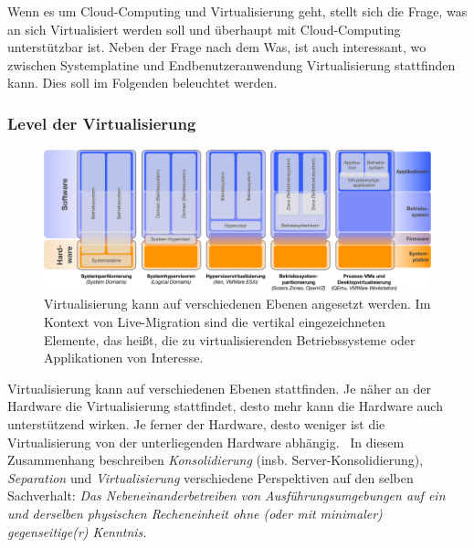 
Wenn es um Cloud-Computing und Virtualisierung geht, stellt sich die
Frage, was an sich Virtualisiert werden soll und überhaupt mit
Cloud-Computing unterstützbar ist. Neben der Frage nach dem Was, ist
auch interessant, wo zwischen Systemplatine und Endbenutzeranwendung
Virtualisierung stattfinden kann. Dies soll im Folgenden beleuchtet werden.


\subsubsection{Level der Virtualisierung}
\label{sec:def-virtualisierung}

\begin{figure}[htbp]
  \centering
  \includegraphics[width=\textwidth]{images/Virtualisierungslevel}
  \caption{Virtualisierung kann auf verschiedenen Ebenen angesetzt werden. Im Kontext von Live-Migration sind die vertikal eingezeichneten Elemente, das heißt, die zu virtualisierenden Betriebssysteme oder Applikationen von Interesse. }
  \label{fig:levels}
\end{figure}

Virtualisierung kann auf verschiedenen Ebenen stattfinden. Je näher an
der Hardware die Virtualisierung stattfindet, desto mehr kann die
Hardware auch unterstützend wirken. Je ferner der Hardware, desto
weniger ist die Virtualisierung von der unterliegenden Hardware
abhängig.~\cite{Giesekus2010:Virtualisierung} In diesem Zusammenhang
beschreiben \emph{Konsolidierung} (insb. Server-Konsolidierung),
\emph{Separation} und \emph{Virtualisierung} verschiedene Perspektiven
auf den selben Sachverhalt: \emph{Das Nebeneinanderbetreiben von
Ausführungsumgebungen auf ein und derselben physischen Recheneinheit
ohne (oder mit minimaler) gegenseitige(r) Kenntnis.}

